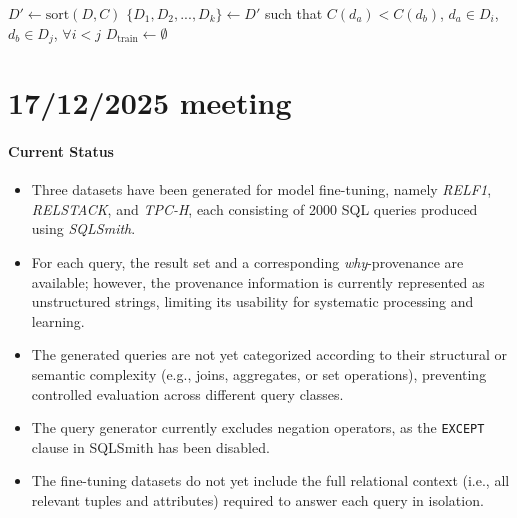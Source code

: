 \documentclass{article}
\begin{document}
\begin{algorithm}[H]
\caption{Baby Step Training Scheduler\cite{curriculumsurvey}}
\label{alg:baby_step}
$D' \leftarrow \text{sort}(D, C)$\;
$\{D_1, D_2, ..., D_k\} \leftarrow D'$ such that
$C(d_a) < C(d_b)$, $d_a \in D_i$, $d_b \in D_j$, $\forall i < j$\;
$D_{\text{train}} \leftarrow \emptyset$\;
\end{algorithm}


\section{17/12/2025 meeting}
\paragraph{Current Status}
\begin{itemize}
    \item Three datasets have been generated for model fine-tuning, namely \textit{RELF1}, \textit{RELSTACK}, and \textit{TPC-H}, each consisting of 2000 SQL queries produced using \textit{SQLSmith}. 
    \item For each query, the result set and a corresponding \textit{why}-provenance are available; however, the provenance information is currently represented as unstructured strings, limiting its usability for systematic processing and learning.
    \item The generated queries are not yet categorized according to their structural or semantic complexity (e.g., joins, aggregates, or set operations), preventing controlled evaluation across different query classes.
    \item The query generator currently excludes negation operators, as the \texttt{EXCEPT} clause in SQLSmith has been disabled.
    \item The fine-tuning datasets do not yet include the full relational context (i.e., all relevant tuples and attributes) required to answer each query in isolation.
\end{itemize}
\end{document}
